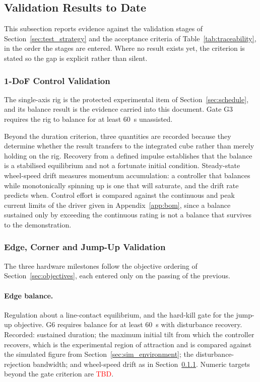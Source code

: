 \subsection{Validation Results to Date}
\label{sec:validation_results}

This subsection reports evidence against the validation stages of
Section~\ref{sec:test_strategy} and the acceptance criteria of
Table~\ref{tab:traceability}, in the order the stages are entered. Where no
result exists yet, the criterion is stated so the gap is explicit rather than
silent.

\subsubsection{1-DoF Control Validation}
\label{sec:test_1dof}

The single-axis rig is the protected experimental item of
Section~\ref{sec:schedule}, and its balance result is the evidence carried into
this document. Gate G3 requires the rig to balance for at least 60~s unassisted.

Beyond the duration criterion, three quantities are recorded because they
determine whether the result transfers to the integrated cube rather than merely
holding on the rig. Recovery from a defined impulse establishes that the balance
is a stabilised equilibrium and not a fortunate initial condition. Steady-state
wheel-speed drift measures momentum accumulation: a controller that balances
while monotonically spinning up is one that will saturate, and the drift rate
predicts when. Control effort is compared against the continuous and peak current
limits of the driver given in Appendix~\ref{app:bom}, since a balance sustained
only by exceeding the continuous rating is not a balance that survives to the
demonstration.

\subsubsection{Edge, Corner and Jump-Up Validation}
\label{sec:test_milestones}

The three hardware milestones follow the objective ordering of
Section~\ref{sec:objectives}, each entered only on the passing of the previous.

\paragraph{Edge balance.}
\label{sec:test_edge}
Regulation about a
line-contact equilibrium, and the hard-kill gate for the jump-up objective. G6
requires balance for at least 60~s with disturbance recovery. Recorded:
sustained duration; the maximum initial tilt from which the controller
recovers, which is the experimental region of attraction and is compared
against the simulated figure from Section~\ref{sec:sim_environment}; the
disturbance-rejection bandwidth; and wheel-speed drift as in
Section~\ref{sec:test_1dof}. Numeric targets beyond the gate criterion are
\textcolor{red}{TBD}.


